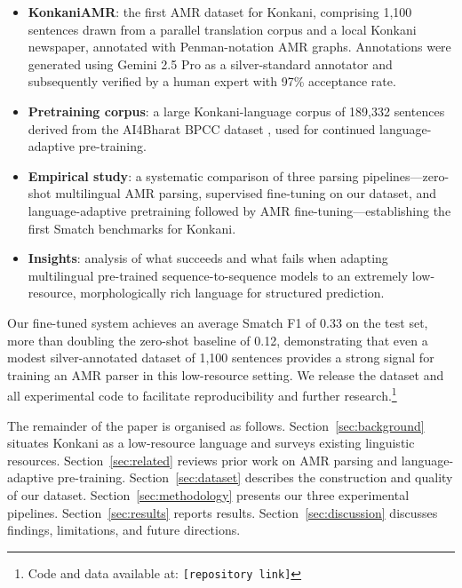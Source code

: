 \begin{itemize}
    \item \textbf{KonkaniAMR}: the first AMR dataset for Konkani, comprising 1,100 sentences drawn from a parallel translation corpus and a local Konkani newspaper, annotated with Penman-notation AMR graphs. Annotations were generated using Gemini 2.5 Pro as a silver-standard annotator and subsequently verified by a human expert with 97\% acceptance rate.

    \item \textbf{Pretraining corpus}: a large Konkani-language corpus of 189,332 sentences derived from the AI4Bharat BPCC dataset \cite{gala2023indictrans2}, used for continued language-adaptive pre-training.

    \item \textbf{Empirical study}: a systematic comparison of three parsing pipelines—zero-shot multilingual AMR parsing, supervised fine-tuning on our dataset, and language-adaptive pretraining followed by AMR fine-tuning—establishing the first Smatch benchmarks for Konkani.

    \item \textbf{Insights}: analysis of what succeeds and what fails when adapting multilingual pre-trained sequence-to-sequence models to an extremely low-resource, morphologically rich language for structured prediction.
\end{itemize}

Our fine-tuned system achieves an average Smatch F1 of 0.33 on the test set, more than doubling the zero-shot baseline of 0.12, demonstrating that even a modest silver-annotated dataset of 1,100 sentences provides a strong signal for training an AMR parser in this low-resource setting. We release the dataset and all experimental code to facilitate reproducibility and further research.\footnote{Code and data available at: \texttt{[repository link]}}

The remainder of the paper is organised as follows. Section~\ref{sec:background} situates Konkani as a low-resource language and surveys existing linguistic resources. Section~\ref{sec:related} reviews prior work on AMR parsing and language-adaptive pre-training. Section~\ref{sec:dataset} describes the construction and quality of our dataset. Section~\ref{sec:methodology} presents our three experimental pipelines. Section~\ref{sec:results} reports results. Section~\ref{sec:discussion} discusses findings, limitations, and future directions.

